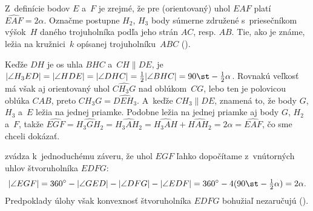 {\ineriesenie
Z~definície bodov $E$ a~$F$ je zrejmé, že pre (orientovaný) uhol $EAF$ platí
$\widehat{EAF}=2\alpha$. Označme postupne $H_2$, $H_3$ body súmerne združené s~priesečníkom
výšok~$H$ daného trojuholníka podľa jeho strán $AC$, resp. $AB$. Tie, ako je známe,
ležia na kružnici~$k$ opísanej trojuholníku~$ABC$ (\obr).

Keďže $DH$ je os uhla $BHC$ a~$CH\parallel DE$, je $|\angle H_3ED|=|\angle HDE|
=|\angle DHC|=\frac12|\angle BHC|=90\st-\frac12\alpha$. Rovnakú veľkosť
má však aj orientovaný uhol $\widehat{CH_3G}$ nad oblúkom~$CG$,
lebo ten je polovicou oblúka $CAB$, preto $\widehat{CH_3G}=\widehat{DEH_3}$.
A~keďže $CH_3\parallel DE$, znamená to, že body $G$, $H_3$ a~$E$
ležia na jednej priamke. Podobne ležia na jednej priamke aj body $G$, $H_2$ a~$F$, takže
$\widehat{EGF}=\widehat{H_3GH_2}=\widehat{H_3AH_2}
=\widehat{H_3AH}+\widehat{HAH_2}=2\alpha=\widehat{EAF}$, čo sme
chceli dokázať.
%

\poznamka
{} zvádza k~jednoduchému záveru, že uhol $EGF$ ľahko dopočítame
z~vnútorných uhlov štvoruholníka $EDFG$:
$$
|\angle EGF| =360^{\circ}- |\angle GED|-|\angle DFG|-|\angle EDF|
=360^{\circ}-4(90\st-\tfrac12\alpha)=2\alpha.
$$
Predpoklady úlohy však konvexnosť štvoruholníka $EDFG$ bohužiaľ nezaručujú
(\obr).
%
}

